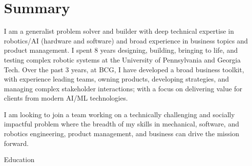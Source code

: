 \documentclass[10pt, letter]{article}
\begin{document}


\section*{Summary}
\hspace*{\fill}\begin{minipage}{\textwidth-\cvindent}
I am a generalist problem solver and builder with deep technical expertise in robotics/AI (hardware and software) and broad experience in business topics and product management.
I spent 8 years designing, building, bringing to life, and testing complex robotic systems at the University of Pennsylvania and Georgia Tech.
Over the past 3 years, at BCG, I have developed a broad business toolkit, with experience leading teams, owning products, developing strategies, and managing complex stakeholder interactions; with a focus on delivering value for clients from modern AI/ML technologies.

I am looking to join a team working on a technically challenging and socially impactful problem where the breadth of my skills in mechanical, software, and robotics engineering, product management, and business can drive the mission forward.


\end{minipage}

\begin{cvsection}{Education}




\end{cvsection}
\end{document}
